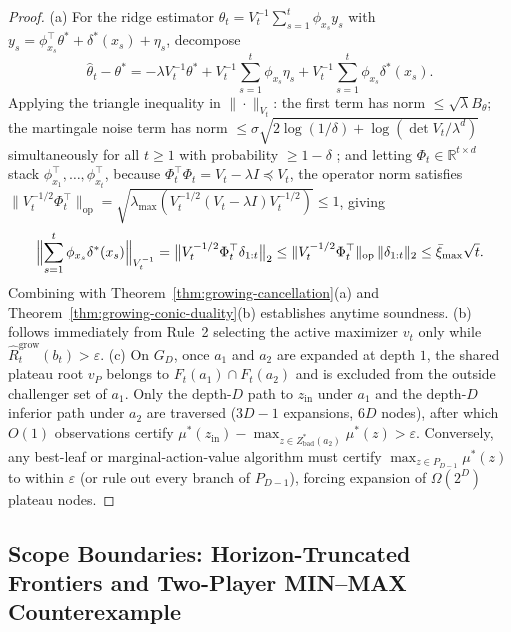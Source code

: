 \documentclass{article}
\theoremstyle{plain}
\theoremstyle{definition}
\begin{document}
\begin{proof}
(a) For the ridge estimator $\widehat\theta_t = V_t^{-1}\sum_{s=1}^t \phi_{x_s} y_s$ with $y_s = \phi_{x_s}^\top \theta^* + \delta^*(x_s) + \eta_s$, decompose
\[
  \widehat\theta_t - \theta^*
  = -\lambda V_t^{-1}\theta^*
    + V_t^{-1}\sum_{s=1}^t \phi_{x_s}\eta_s
    + V_t^{-1}\sum_{s=1}^t \phi_{x_s}\delta^*(x_s).
\]
Applying the triangle inequality in $\|\cdot\|_{V_t}$: the first term has norm $\le \sqrt{\lambda} B_\theta$; the martingale noise term has norm $\le \sigma\sqrt{2\log(1/\delta) + \log(\det V_t/\lambda^d)}$ simultaneously for all $t \ge 1$ with probability $\ge 1 - \delta$ \citep{abbasi2011}; and letting $\Phi_t \in \mathbb{R}^{t \times d}$ stack $\phi_{x_1}^\top, \dots, \phi_{x_t}^\top$, because $\Phi_t^\top \Phi_t = V_t - \lambda I \preceq V_t$, the operator norm satisfies $\|V_t^{-1/2}\Phi_t^\top\|_{\mathrm{op}} = \sqrt{\lambda_{\max}(V_t^{-1/2}(V_t - \lambda I)V_t^{-1/2})} \le 1$, giving
\[
  \Bigl\|\sum_{s=1}^t \phi_{x_s}\delta^*(x_s)\Bigr\|_{V_t^{-1}}
  = \bigl\|V_t^{-1/2}\Phi_t^\top \delta_{1:t}\bigr\|_2
  \le \|V_t^{-1/2}\Phi_t^\top\|_{\mathrm{op}}\, \|\delta_{1:t}\|_2
  \le \bar\xi_{\max}\sqrt{t}.
\]
Combining with Theorem~\ref{thm:growing-cancellation}(a) and Theorem~\ref{thm:growing-conic-duality}(b) establishes anytime soundness. (b) follows immediately from Rule~2 selecting the active maximizer $v_t$ only while $\widehat R_t^{\mathrm{grow}}(b_t) > \varepsilon$. (c) On $G_D$, once $a_1$ and $a_2$ are expanded at depth $1$, the shared plateau root $v_P$ belongs to $F_t(a_1) \cap F_t(a_2)$ and is excluded from the outside challenger set of $a_1$. Only the depth-$D$ path to $z_{\mathrm{in}}$ under $a_1$ and the depth-$D$ inferior path under $a_2$ are traversed ($3D - 1$ expansions, $6D$ nodes), after which $O(1)$ observations certify $\mu^*(z_{\mathrm{in}}) - \max_{z \in Z^*_{\mathrm{bad}}(a_2)} \mu^*(z) > \varepsilon$. Conversely, any best-leaf or marginal-action-value algorithm must certify $\max_{z \in P_{D-1}} \mu^*(z)$ to within $\varepsilon$ (or rule out every branch of $P_{D-1}$), forcing expansion of $\Omega(2^D)$ plateau nodes.
\end{proof}

\subsection{Scope Boundaries: Horizon-Truncated Frontiers and Two-Player MIN--MAX Counterexample}
\label{app:growing-scope}
\end{document}
